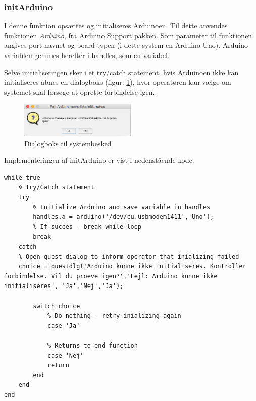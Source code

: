 \subsubsection{initArduino}
I denne funktion opsættes og initialiseres Arduinoen. Til dette anvendes funktionen \textit{Arduino}, fra Arduino Support pakken. Som parameter til funktionen angives port navnet og board typen (i dette system en Arduino Uno). Arduino variablen gemmes herefter i handles, som en variabel.


Selve initialiseringen sker i et try/catch statement, hvis Arduinoen ikke kan initialiseres åbnes en dialogboks (figur: \ref{fig:initArduino}), hvor operatøren kan vælge om systemet skal forsøge at oprette forbindelse igen. 

\begin{figure}[H]
	\centering
	\includegraphics[width=0.5\textwidth]{billeder/software/initArduino.png}
	\caption{Dialogboks til systembesked}
	\label{fig:initArduino}
\end{figure}

Implementeringen af initArduino er vist i nedenstående kode.
\begin{lstlisting} 
while true
    % Try/Catch statement
    try
        % Initialize Arduino and save variable in handles
        handles.a = arduino('/dev/cu.usbmodem1411','Uno');
        % If succes - break while loop
        break
    catch
    % Open quest dialog to inform operator that inializing failed    
    choice = questdlg('Arduino kunne ikke initialiseres. Kontroller forbindelse. Vil du proeve igen?','Fejl: Arduino kunne ikke initialiseres', 'Ja','Nej','Ja');

        switch choice
            % Do nothing - retry inializing again
            case 'Ja'
        
            % Returns to end function
            case 'Nej'
            return
        end
    end
end
\end{lstlisting} 
